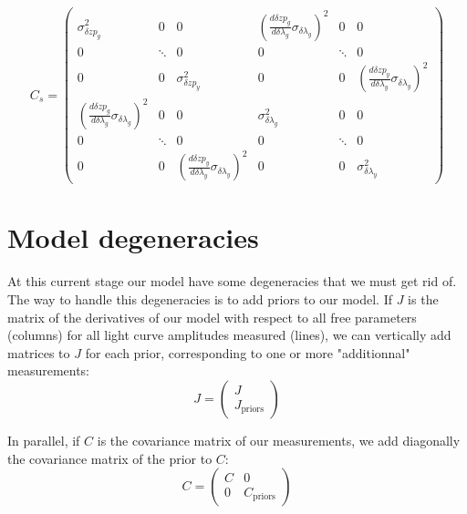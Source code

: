 \documentclass[\docopts]{\docclass}
\begin{document}
\begin{equation}
\label{eq::cov_calib}
C_s = 
\begin{pmatrix}
   \sigma^2_{\delta zp_{g}} & 0 & 0 & (\frac{d \delta zp_g}{d \delta \lambda_g} \sigma_{\delta \lambda_g})^2 & 0 & 0 \\
   0 & \ddots & 0 & 0 & \ddots & 0 \\
   0 & 0 & \sigma^2_{\delta zp_{y}} & 0 & 0 & (\frac{d \delta zp_y}{d \delta \lambda_y} \sigma_{\delta \lambda_y})^2 \\
   (\frac{d \delta zp_g}{d \delta \lambda_g} \sigma_{\delta \lambda_g})^2 & 0 & 0 & \sigma^2_{\delta\lambda_{g}} & 0 & 0 \\
   0 & \ddots & 0 & 0 & \ddots & 0 \\
   0 & 0 & (\frac{d \delta zp_y}{d \delta \lambda_y} \sigma_{\delta \lambda_y})^2 & 0 & 0 & \sigma^2_{\delta\lambda_{y}}
\end{pmatrix}
\end{equation}


\section{Model degeneracies}
\label{sec::model_deg}

At this current stage our model have some degeneracies that we must get rid of.
The way to handle this degeneracies is to add priors to our model.
If $J$ is the matrix of the derivatives  of our model with respect to all free parameters (columns) for all light curve amplitudes measured (lines), we can vertically add matrices to $J$ for each prior, corresponding to one or more "additionnal" measurements:
\begin{equation}
J =
\begin{pmatrix}
  J \\
  J_\text{priors}
\end{pmatrix} 
\end{equation}

In parallel, if $C$ is the covariance matrix of our measurements, we add diagonally the covariance matrix of the prior to $C$:
\begin{equation}
C =
\begin{pmatrix}
  C & 0 \\
  0 & C_\text{priors}
\end{pmatrix} 
\end{equation}
\end{document}

